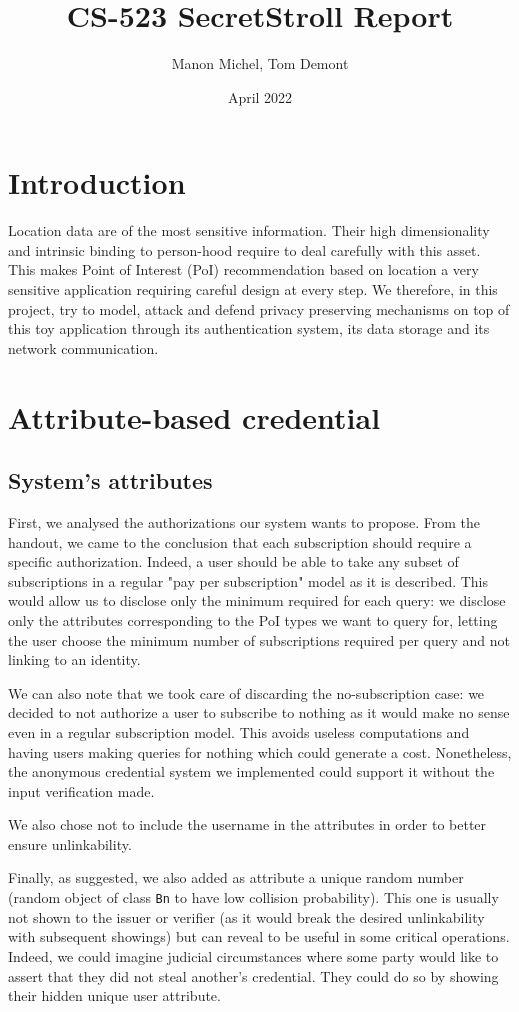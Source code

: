\documentclass[10pt,conference,compsocconf]{IEEEtran}
\title{CS-523 SecretStroll Report}
\author{Manon Michel, Tom Demont}
\date{April 2022}
\begin{document}
\maketitle


\section{Introduction}
Location data are of the most sensitive information. Their high dimensionality and intrinsic binding to person-hood require to deal carefully with this asset. This makes Point of Interest (PoI) recommendation based on location a very sensitive application requiring careful design at every step. We therefore, in this project, try to model, attack and defend privacy preserving mechanisms on top of this toy application through its authentication system, its data storage and its network communication.

\section{Attribute-based credential}
\subsection{System's attributes}
First, we analysed the authorizations our system wants to propose. From the handout, we came to the conclusion that each subscription should require a specific authorization. Indeed, a user should be able to take any subset of subscriptions in a regular "pay per subscription" model as it is described. This would allow us to disclose only the minimum required for each query: we disclose only the attributes corresponding to the PoI types we want to query for, letting the user choose the minimum number of subscriptions required per query and not linking to an identity.

We can also note that we took care of discarding the no-subscription case: we decided to not authorize a user to subscribe to nothing as it would make no sense even in a regular subscription model. This avoids useless computations and having users making queries for nothing which could generate a cost. Nonetheless, the anonymous credential system we implemented could support it without the input verification made.

We also chose not to include the username in the attributes in order to better ensure unlinkability.

Finally, as suggested, we also added as attribute a unique random number (random object of class \texttt{Bn} to have low collision probability). This one is usually not shown to the issuer or verifier (as it would break the desired unlinkability with subsequent showings) but can reveal to be useful in some critical operations. Indeed, we could imagine judicial circumstances where some party would like to assert that they did not steal another's credential. They could do so by showing their hidden unique user attribute.
\end{document}
